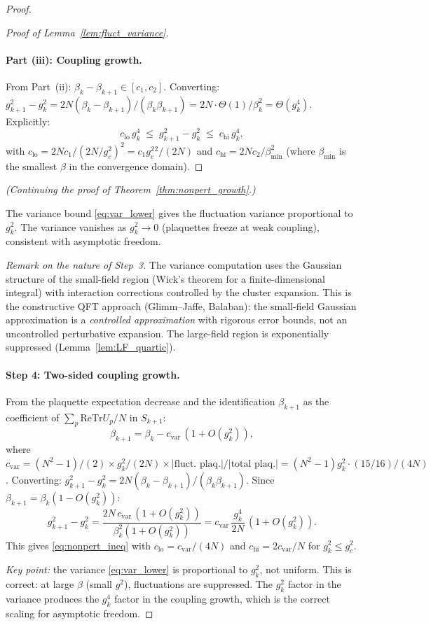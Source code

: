 \documentclass[11pt,a4paper]{amsart}
\theoremstyle{definition}
\newcommand{\re}{\mathrm{Re}}
\newcommand{\Tr}{\mathrm{Tr}}
\newcommand{\gB}{g^2_c}
\begin{document}
\begin{proof}
\begin{proof}[Proof of Lemma~\ref{lem:fluct_variance}]
\paragraph{Part (iii): Coupling growth.}
From Part~(ii): $\beta_k - \beta_{k+1} \in [c_1, c_2]$.
Converting: $g^2_{k+1} - g^2_k = 2N(\beta_k - \beta_{k+1})/(\beta_k\beta_{k+1})
= 2N \cdot \Theta(1) / \beta_k^2 = \Theta(g^4_k)$.
Explicitly:
\[
  c_{\mathrm{lo}}\,g^4_k \;\le\; g^2_{k+1} - g^2_k \;\le\; c_{\mathrm{hi}}\,g^4_k,
\]
with $c_{\mathrm{lo}} = 2N c_1/(2N/\gB)^2 = c_1\gB^2/(2N)$
and $c_{\mathrm{hi}} = 2N c_2/\beta_{\min}^2$ (where $\beta_{\min}$
is the smallest $\beta$ in the convergence domain).
\end{proof}

\noindent\emph{(Continuing the proof of Theorem~\ref{thm:nonpert_growth}.)}

\noindent
The variance bound \eqref{eq:var_lower} gives the fluctuation variance
proportional to $g^2_k$.  The variance vanishes as $g^2_k \to 0$
(plaquettes freeze at weak coupling), consistent with asymptotic freedom.

\emph{Remark on the nature of Step~3.}
The variance computation uses the Gaussian structure of the small-field
region (Wick's theorem for a finite-dimensional integral) with interaction
corrections controlled by the cluster expansion.
This is the constructive QFT approach (Glimm--Jaffe, Balaban):
the small-field Gaussian approximation is a \emph{controlled approximation}
with rigorous error bounds, not an uncontrolled perturbative expansion.
The large-field region is exponentially suppressed
(Lemma~\ref{lem:LF_quartic}).

\paragraph{Step 4: Two-sided coupling growth.}
From the plaquette expectation decrease and the identification
$\beta_{k+1}$ as the coefficient of $\sum_p \re\Tr U_p/N$ in $S_{k+1}$:
\[
  \beta_{k+1} = \beta_k - c_{\mathrm{var}}\,(1 + O(g^2_k)),
\]
where $c_{\mathrm{var}} = (N^2-1)/(2) \times g^2_k/(2N) \times |\text{fluct.\ plaq.}|/|\text{total plaq.}|
= (N^2-1)g^2_k \cdot (15/16)/(4N)$.
Converting: $g^2_{k+1} - g^2_k = 2N(\beta_k - \beta_{k+1})/(\beta_k\beta_{k+1})$.
Since $\beta_{k+1} = \beta_k(1 - O(g^2_k))$:
\[
  g^2_{k+1} - g^2_k
  = \frac{2N\,c_{\mathrm{var}}\,(1+O(g^2_k))}{\beta_k^2(1+O(g^2_k))}
  = c_{\mathrm{var}}\,\frac{g^4_k}{2N}\,(1+O(g^2_k)).
\]
This gives \eqref{eq:nonpert_ineq} with
$c_{\mathrm{lo}} = c_{\mathrm{var}}/(4N)$ and
$c_{\mathrm{hi}} = 2c_{\mathrm{var}}/N$ for $g^2_k \le \gB$.

\emph{Key point:} the variance \eqref{eq:var_lower} is proportional to $g^2_k$,
not uniform.  This is correct: at large $\beta$ (small $g^2$), fluctuations
are suppressed.  The $g^2_k$ factor in the variance produces the $g^4_k$
factor in the coupling growth, which is the correct scaling for
asymptotic freedom.
\end{proof}
\end{document}

